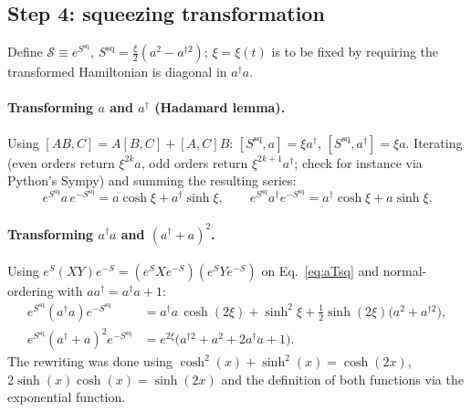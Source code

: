 \documentclass[../../main.tex]{subfiles}
\begin{document}
\subsection*{Step 4: squeezing transformation}
\label{sec:step4-squeezing}

Define $\mathcal S\equiv e^{S^{\mathrm{sq}}}$, $S^{\mathrm{sq}}=\tfrac{\xi}{2}
(a^2-a^{\dagger2})$; $\xi=\xi(t)$ is to be fixed by requiring the transformed
Hamiltonian is diagonal in $a^\dagger a$.

\paragraph{Transforming $a$ and $a^\dagger$ (Hadamard lemma).}
Using $[AB,C]=A[B,C]+[A,C]B$: $[S^{\mathrm{sq}},a]=\xi a^\dagger$,
$[S^{\mathrm{sq}},a^\dagger]=\xi a$. Iterating (even orders return $\xi^{2k}a$,
odd orders return $\xi^{2k+1}a^\dagger$; check for instance via Python's Sympy) and summing the resulting series:
\begin{equation}
e^{S^{\mathrm{sq}}}a\,e^{-S^{\mathrm{sq}}}=a\cosh\xi+a^\dagger\sinh\xi,
\qquad
e^{S^{\mathrm{sq}}}a^\dagger e^{-S^{\mathrm{sq}}}=a^\dagger\cosh\xi+a\sinh\xi.
\label{eq:aTsq}
\end{equation}

\paragraph{Transforming $a^\dagger a$ and $(a^\dagger+a)^2$.}
Using $e^S(XY)e^{-S}=(e^SXe^{-S})(e^SYe^{-S})$
on Eq.~\eqref{eq:aTsq} and normal-ordering with $aa^\dagger=a^\dagger a+1$:
\begin{align}
e^{S^{\mathrm{sq}}}(a^\dagger a)e^{-S^{\mathrm{sq}}}
&=a^\dagger a\,\cosh(2\xi)+\sinh^2\xi+\tfrac12\sinh(2\xi)\big(a^2+a^{\dagger2}\big),
\label{eq:numtransform}\\
e^{S^{\mathrm{sq}}}(a^\dagger+a)^2e^{-S^{\mathrm{sq}}}
&=e^{2\xi}\big(a^{\dagger2}+a^2+2a^\dagger a+1\big). \label{eq:sqtransform}
\end{align}
The rewriting was done using $\cosh^2(x) + \sinh^2(x) = \cosh(2x)$, $2\sinh(x)\cosh(x) = \sinh(2x)$ and the definition of both functions via the exponential function.
\end{document}
